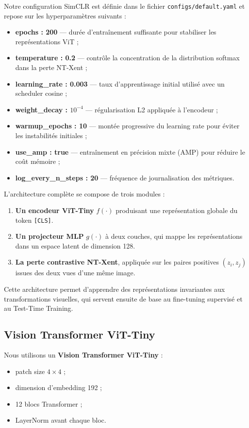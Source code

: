 \documentclass[12pt,a4paper]{report}
\begin{document}
	Notre configuration SimCLR est définie dans le fichier \texttt{configs/default.yaml} et repose sur les hyperparamètres suivants :
	\begin{itemize}
		\item \textbf{epochs : 200} — durée d’entraînement suffisante pour stabiliser les représentations ViT ;
		\item \textbf{temperature : 0.2} — contrôle la concentration de la distribution softmax dans la perte NT-Xent ;
		\item \textbf{learning\_rate : 0.003} — taux d’apprentissage initial utilisé avec un scheduler cosine ;
		\item \textbf{weight\_decay : $10^{-4}$} — régularisation L2 appliquée à l’encodeur ;
		\item \textbf{warmup\_epochs : 10} — montée progressive du learning rate pour éviter les instabilités initiales ;
		\item \textbf{use\_amp : true} — entraînement en précision mixte (AMP) pour réduire le coût mémoire ;
		\item \textbf{log\_every\_n\_steps : 20} — fréquence de journalisation des métriques.
	\end{itemize}
	
	L’architecture complète se compose de trois modules :
	\begin{enumerate}
		\item \textbf{Un encodeur ViT-Tiny} $f(\cdot)$ produisant une représentation globale du token \texttt{[CLS]}.
		\item \textbf{Un projecteur MLP} $g(\cdot)$ à deux couches, qui mappe les représentations dans un espace latent de dimension 128.
		\item \textbf{La perte contrastive NT-Xent}, appliquée sur les paires positives $(z_i, z_j)$ issues des deux vues d’une même image.
	\end{enumerate}
	
	Cette architecture permet d’apprendre des représentations invariantes aux transformations visuelles, qui servent ensuite de base au fine-tuning supervisé et au Test-Time Training.
	
	\subsection{Vision Transformer ViT-Tiny}
	Nous utilisons un \textbf{Vision Transformer ViT-Tiny} :
	\begin{itemize}
		\item patch size $4\times4$ ;
		\item dimension d’embedding 192 ;
		\item 12 blocs Transformer ;
		\item LayerNorm avant chaque bloc.
	\end{itemize}
	
\end{document}
